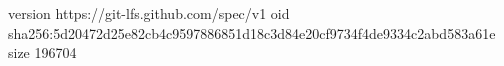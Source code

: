 version https://git-lfs.github.com/spec/v1
oid sha256:5d20472d25e82cb4c9597886851d18c3d84e20cf9734f4de9334c2abd583a61e
size 196704
